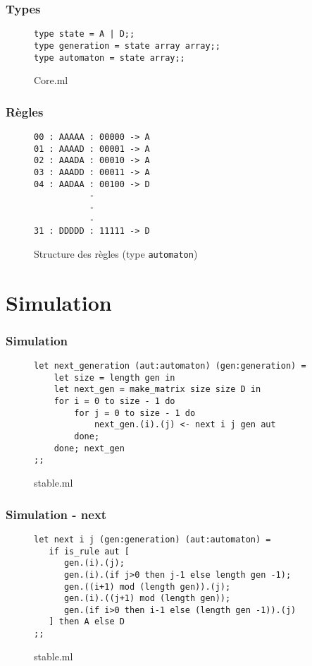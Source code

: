 \documentclass[10pt]{beamer}
\begin{document}
\lstset{language=[Objective]Caml}
\begin{frame}[fragile]
	\frametitle{Types}
	\lstset{
	basicstyle=\footnotesize, frame=tb,
	xleftmargin=.2\textwidth, xrightmargin=.2\textwidth
	}
\begin{figure}
\caption{Core.ml}
\begin{lstlisting}
type state = A | D;;
type generation = state array array;;
type automaton = state array;;
\end{lstlisting}
\end{figure}
\end{frame}

\begin{frame}[fragile]
	\frametitle{Règles}
	\lstset{
	basicstyle=\footnotesize, frame=tb,
	xleftmargin=.2\textwidth, xrightmargin=.2\textwidth
	}
\begin{figure}
\caption{Structure des règles (type \texttt{automaton})}
\begin{lstlisting}
00 : AAAAA : 00000 -> A
01 : AAAAD : 00001 -> A
02 : AAADA : 00010 -> A
03 : AAADD : 00011 -> A
04 : AADAA : 00100 -> D
           -
           -
           -
31 : DDDDD : 11111 -> D
\end{lstlisting}
\end{figure}
\end{frame}

\section{Simulation}

\begin{frame}[fragile]
	\frametitle{Simulation}
\begin{figure}
\caption{stable.ml}
\begin{lstlisting}
let next_generation (aut:automaton) (gen:generation) =
    let size = length gen in
    let next_gen = make_matrix size size D in
    for i = 0 to size - 1 do
        for j = 0 to size - 1 do
	        next_gen.(i).(j) <- next i j gen aut
        done;
    done; next_gen
;;
\end{lstlisting}
\end{figure}
\end{frame}

\begin{frame}[fragile]
	\frametitle{Simulation - next}
\begin{figure}
\caption{stable.ml}
\begin{lstlisting}
let next i j (gen:generation) (aut:automaton) =
   if is_rule aut [
      gen.(i).(j);
      gen.(i).(if j>0 then j-1 else length gen -1);
      gen.((i+1) mod (length gen)).(j);
      gen.(i).((j+1) mod (length gen));
      gen.(if i>0 then i-1 else (length gen -1)).(j)
   ] then A else D
;;
\end{lstlisting}
\end{figure}
\end{frame}
\end{document}
